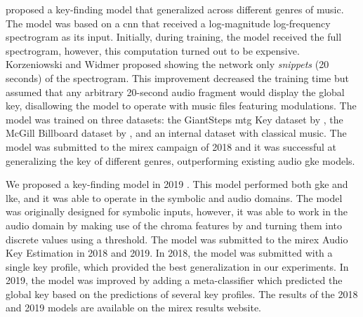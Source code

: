 \textcite{korzeniowski2018genreagnostic} proposed a
key-finding model that generalized across different genres
of music. The model was based on a \gls{cnn} that received a
log-magnitude log-frequency spectrogram as its input.
Initially, during training, the model received the full
spectrogram, however, this computation turned out to be
expensive. Korzeniowski and Widmer proposed showing the
network only \emph{snippets} (20 seconds) of the
spectrogram. This improvement decreased the training time
but assumed that any arbitrary 20-second audio fragment
would display the global key, disallowing the model to
operate with music files featuring modulations. The model
was trained on three datasets: the GiantSteps \gls{mtg} Key
dataset by \textcite{faraldo2016key}, the McGill Billboard
dataset by \textcite{burgoyne2011expert}, and an internal
dataset with classical music. The model was submitted to the
\gls{mirex} campaign of 2018 and it was successful at
generalizing the key of different genres, outperforming
existing audio \gls{gke} models.


We proposed a key-finding model in 2019
\parencite{napoleslopez2019keyfinding}. This model performed
both \gls{gke} and \gls{lke}, and it was able to operate in
the symbolic and audio domains. The model was originally
designed for symbolic inputs, however, it was able to work
in the audio domain by making use of the chroma features by
\textcite{mauch2010approximate} and turning them into discrete values using a threshold. The model was submitted to the \gls{mirex} Audio Key Estimation in 2018 and 2019. In 2018, the model was submitted with a single key profile, which provided the best generalization in our experiments. In 2019, the model was improved by adding a meta-classifier which predicted the global key based on the predictions of several key profiles. The results of the 2018 and 2019 models are available on the \gls{mirex} results website.

